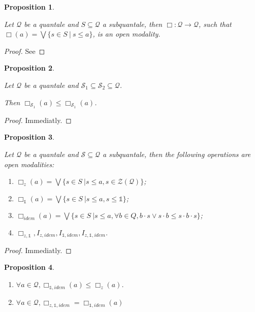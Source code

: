 \documentclass[a4paper]{article}
\theoremstyle{defin}
\theoremstyle{theorem}
\theoremstyle{prop}
\newtheorem{prop}{Proposition}
\theoremstyle{lemma}
\theoremstyle{ex}
\theoremstyle{col}
\begin{document}
\begin{prop}
$ $

  Let $\mathcal{Q}$ be a quantale and $S \subseteq \mathcal{Q}$ a subquantale,
  then $\Box : \mathcal{Q} \to \mathcal{Q}$, such that $\Box(a) = \bigvee \{ s \in S \: | \: s \leq a \}$, is an open modality.
\end{prop}

\begin{proof}
  See
\end{proof}

\begin{prop}
$ $

  Let $\mathcal{Q}$ be a quantale and $\mathcal{S}_1 \subseteq \mathcal{S}_2 \subseteq \mathcal{Q}$.

  Then $\Box_{\mathcal{S}_1} (a) \leq \Box_{\mathcal{S}_1} (a)$.
\end{prop}

\begin{proof}

Immediatly.
\end{proof}

\begin{prop}
$ $

Let $\mathcal{Q}$ be a quantale and $\mathcal{S} \subseteq \mathcal{Q}$ a subquantale, then the following operations are open modalities:

\begin{enumerate}
  \item $\Box_z (a) = \bigvee \{ s \in S \: | s \leq a, s \in \mathcal{Z}(\mathcal{Q}) \}$;
  \item $\Box_{\mathds{1}} (a) = \bigvee \{ s \in S \: | s \leq a, s \leq \mathds{1} \}$;
  \item $\Box_{idem} (a) = \bigvee \{ s \in S \: | s \leq a, \forall b \in Q, b \cdot s \vee s \cdot b \leq s \cdot b \cdot s\}$;
  \item $\Box_{z, \mathds{1}}, I_{z, idem}, I_{\mathds{1}, idem}, I_{z, \mathds{1}, idem}$.
\end{enumerate}
\end{prop}

\begin{proof}
  Immediatly.
\end{proof}

\begin{prop}
$ $

\begin{enumerate}
  \item $\forall a \in \mathcal{Q}, \Box_{\mathds{1}, idem}(a) \leq \Box_z (a)$.
  \item $\forall a \in \mathcal{Q}, \Box_{z, \mathds{1}, idem} = \Box_{\mathds{1}, idem}(a)$
\end{enumerate}

\end{prop}
\end{document}
